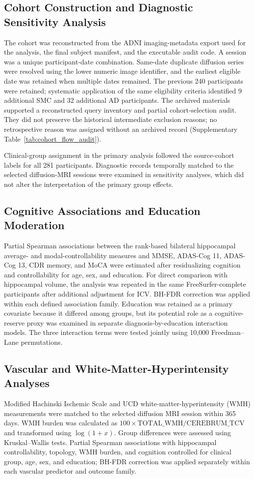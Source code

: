 \documentclass{article}
\begin{document}
\subsection{Cohort Construction and Diagnostic Sensitivity Analysis}
The cohort was reconstructed from the ADNI imaging-metadata export used for the analysis, the final subject manifest, and the executable audit code. A session was a unique participant-date combination. Same-date duplicate diffusion series were resolved using the lower numeric image identifier, and the earliest eligible date was retained when multiple dates remained. The previous 240 participants were retained; systematic application of the same eligibility criteria identified 9 additional SMC and 32 additional AD participants. The archived materials supported a reconstructed query inventory and partial cohort-selection audit. They did not preserve the historical intermediate exclusion reasons; no retrospective reason was assigned without an archived record (Supplementary Table~\ref{tab:cohort_flow_audit}).

Clinical-group assignment in the primary analysis followed the source-cohort labels for all 281 participants. Diagnostic records temporally matched to the selected diffusion-MRI sessions were examined in sensitivity analyses, which did not alter the interpretation of the primary group effects.

\subsection{Cognitive Associations and Education Moderation}
Partial Spearman associations between the rank-based bilateral hippocampal average- and modal-controllability measures and MMSE, ADAS-Cog 11, ADAS-Cog 13,
CDR memory, and MoCA were estimated after residualizing cognition and
controllability for age, sex, and education. For direct comparison with
hippocampal volume, the analysis was repeated in the same FreeSurfer-complete
participants after additional adjustment for ICV. BH-FDR correction was
applied within each defined association family. Education was retained
as a primary covariate because it differed among groups, but its potential role
as a cognitive-reserve proxy was examined in separate
diagnosis-by-education interaction models. The three interaction terms were
tested jointly using 10,000 Freedman--Lane permutations.

\subsection{Vascular and White-Matter-Hyperintensity Analyses}
Modified Hachinski Ischemic Scale and UCD white-matter-hyperintensity (WMH) measurements were matched to the selected diffusion MRI session within 365 days. WMH burden was calculated as \(100\times\mathrm{TOTAL\_WMH}/\mathrm{CEREBRUM\_TCV}\) and transformed using \(\log(1+x)\). Group differences were assessed using Kruskal--Wallis tests. Partial Spearman associations with hippocampal controllability, topology, WMH burden, and cognition controlled for clinical group, age, sex, and education; BH-FDR correction was applied separately within each vascular predictor and outcome family.
\end{document}
